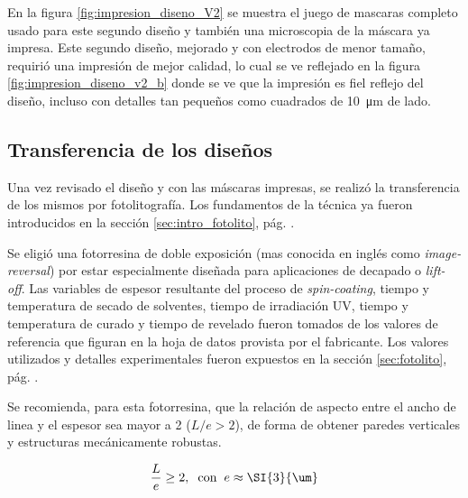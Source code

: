 {		     En la figura \ref{fig:impresion_diseno_V2} se muestra el juego de mascaras completo usado para este segundo diseño y también una microscopia de la máscara ya impresa. Este segundo diseño, mejorado y con electrodos de menor tamaño, requirió una impresión de mejor calidad, lo cual se ve reflejado en la figura \ref{fig:impresion_diseno_v2_b} donde se ve que la impresión es fiel reflejo del diseño, incluso con detalles tan pequeños como cuadrados de \SI{10}{\um} de lado. 
				
 		\subsection{Transferencia de los diseños}

 			 Una vez revisado el diseño y con las máscaras impresas, se realizó la transferencia de los mismos por fotolitografía. Los fundamentos de la técnica ya fueron introducidos en la sección \ref{sec:intro_fotolito}, pág. \pageref{sec:intro_fotolito}.

 			 Se eligió una fotorresina de doble exposición (mas conocida en inglés como \textit{image-reversal}) por estar especialmente diseñada  para aplicaciones de decapado o \textit{lift-off}. Las variables de espesor resultante del proceso de \textit{spin-coating}, tiempo y temperatura de secado de solventes, tiempo de irradiación UV, tiempo y temperatura de curado y tiempo de revelado fueron tomados de los valores de referencia que figuran en la hoja de datos provista por el fabricante. \cite{TI35E} Los valores utilizados y detalles experimentales fueron expuestos en la sección \ref{sec:fotolito}, pág. \pageref{sec:fotolito}.

 			 Se recomienda, para esta fotorresina, que la relación de aspecto entre el ancho de linea y el espesor sea mayor a 2 ($L/e>2$), de forma de obtener paredes verticales y estructuras mecánicamente robustas. 

 				\begin{equation}
				\frac{L}{e} \geq 2, \hspace*{0.2cm}\text{con}\hspace{0.2cm}  e \approx \SI{3}{\um}		
 				\end{equation}

}
